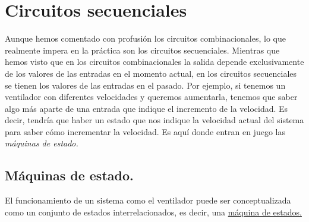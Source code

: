 \section{Circuitos secuenciales}

Aunque hemos comentado con profusión los circuitos combinacionales, lo que realmente impera en la práctica son los circuitos secuenciales. Mientras que hemos visto que en los circuitos combinacionales la salida depende exclusivamente de los valores de las entradas en el momento actual, en los circuitos secuenciales se tienen los valores de las entradas en el pasado. Por ejemplo, si tenemos un ventilador con diferentes velocidades y queremos aumentarla, tenemos que saber algo más aparte de una entrada que indique el incremento de la velocidad. Es decir, tendría que haber un estado que nos indique la velocidad actual del sistema para saber cómo incrementar la velocidad. Es aquí donde entran en juego las \emph{máquinas de estado.}

\subsection{Máquinas de estado.}

El funcionamiento de un sistema como el ventilador puede ser conceptualizada como un conjunto de estados interrelacionados, es decir, una \hyperlink{state-machine}{máquina de estados.}